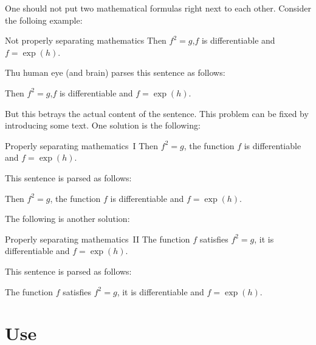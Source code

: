 One should not put two mathematical formulas right next to each other.
Consider the folloing example:
\begin{showlatex}{Not properly separating mathematics}
Then $f^2 = g$,$f$ is differentiable and $f = \exp(h)$.
\end{showlatex}
Thu human eye (and brain) parses this sentence as follows:
\begin{center}
  Then
  \quad
  $f^2 = g$,$f$
  \quad
  is differentiable and
  \quad
  $f = \exp(h)$.
\end{center}
But this betrays the actual content of the sentence.
This problem can be fixed by introducing some text.
One solution is the following:
\begin{showlatex}{Properly separating mathematics~I}
Then $f^2 = g$, the function $f$ is differentiable and $f = \exp(h)$.
\end{showlatex}
This sentence is parsed as follows:
\begin{center}
  Then
  \quad
  $f^2 = g$,
  \quad
  the function
  \quad
  $f$
  \quad
  is differentiable and
  \quad
  $f = \exp(h)$.
\end{center}
The following is another solution:
\begin{showlatex}{Properly separating mathematics~II}
The function $f$ satisfies $f^2 = g$, it is differentiable and $f = \exp(h)$.
\end{showlatex}
This sentence is parsed as follows:
\begin{center}
  The function
  \quad
  $f$
  \quad
  satisfies
  \quad
  $f^2 = g$,
  \quad
  it is differentiable and
  \quad
  $f = \exp(h)$.
\end{center}







\section{Use }


